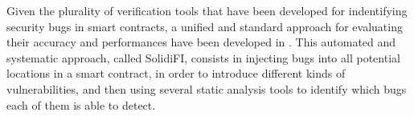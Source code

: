 Given the plurality of verification tools that have been developed for indentifying security bugs in smart contracts, a unified and standard approach for evaluating their accuracy and performances have been developed in \cite{effectiveness_analysis_tools}. This automated and systematic approach, called SolidiFI, consists in injecting bugs into all potential locations in a smart contract, in order to introduce different kinds of vulnerabilities, and then using several static analysis tools to identify which bugs each of them is able to detect.


